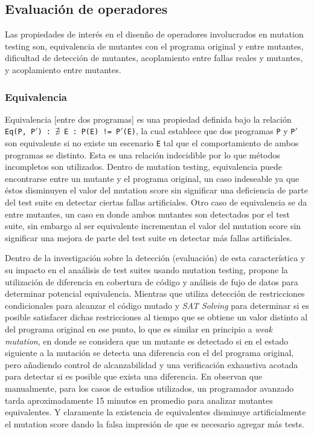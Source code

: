 \subsection{Evaluaci\'on de operadores}

Las propiedades de inter\'es en el disen\~no  de operadores involucrados en mutation testing son, equivalencia de mutantes con el programa original y entre mutantes, dificultad de detecci\'on de mutantes, acoplamiento entre fallas reales y mutantes, y acoplamiento entre mutantes.

\subsubsection{Equivalencia}
Equivalencia [entre dos programas] es una propiedad definida bajo la relaci\'on \texttt{Eq(P, P$\prime$) : $\nexists$ E : P(E) != P$\prime$(E)}, la cual establece que dos programas \texttt{P} y \texttt{P$\prime$} son equivalente si no existe un escenario \texttt{E} tal que el comportamiento de ambos programas se distinto. Esta es una relaci\'on indecidible por lo que m\'etodos incompletos son utilizados. Dentro de mutation testing, equivalencia puede encontrarse entre un mutante y el programa original, un caso indeseable ya que \'estos disminuyen el valor del mutation score sin significar una deficiencia de parte del test suite en detectar ciertas fallas artificiales. Otro caso de equivalencia se da entre mutantes, un caso en donde ambos mutantes son detectados por el test suite, sin embargo al ser equivalente incrementan el valor del mutation score sin significar una mejora de parte del test suite en detectar m\'as fallas artificiales.

Dentro de la investigaci\'on sobre la detecci\'on (evaluaci\'on) de esta caracter\'istica y su impacto en el ana\'alisis de test suites usando mutation testing, \cite{biblography.mutation.evaluation.equivalent.Schuler+10} propone la utilizaci\'on de diferencia en cobertura de c\'odigo y an\'alisis de fujo de datos para determinar potencial equivalencia. Mientras que  \cite{biblography.mutation.evaluation.equivalent.Just+13} utiliza detecci\'on de restricciones condicionales para alcanzar el c\'odigo mutado y \emph{SAT Solving} para determinar si es posible satisfacer dichas restricciones al tiempo que se obtiene un valor distinto al del programa original en ese punto, lo que es similar en principio a \emph{weak mutation}, en donde se considera que un mutante es detectado si en el estado siguiente a la mutaci\'on se detecta una diferencia con el del programa original, pero a\~nadiendo control de alcanzabilidad y una verificaci\'on exhaustiva acotada para detectar si es posible que exista una diferencia.
En \cite{biblography.mutation.evaluation.equivalent.Grun+09} observan que manualmente, para los casos de estudios utilizados, un programador avanzado tarda aproximadamente 15 minutos en promedio para analizar mutantes equivalentes. Y claramente la existencia de equivalentes disminuye artificialmente el mutation score dando la falsa impresi\'on de que es necesario agregar m\'as tests.

